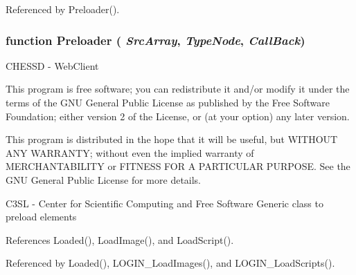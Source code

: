 Referenced by Preloader().
\subsubsection{\setlength{\rightskip}{0pt plus 5cm}function Preloader ( {\em SrcArray}, \/   {\em TypeNode}, \/   {\em CallBack})}\label{preloader_8js_ba519bf0a49938505a3eedbb05164471}


CHESSD - WebClient

This program is free software; you can redistribute it and/or modify it under the terms of the GNU General Public License as published by the Free Software Foundation; either version 2 of the License, or (at your option) any later version.

This program is distributed in the hope that it will be useful, but WITHOUT ANY WARRANTY; without even the implied warranty of MERCHANTABILITY or FITNESS FOR A PARTICULAR PURPOSE. See the GNU General Public License for more details.

C3SL - Center for Scientific Computing and Free Software Generic class to preload elements 

References Loaded(), LoadImage(), and LoadScript().

Referenced by Loaded(), LOGIN\_\-LoadImages(), and LOGIN\_\-LoadScripts().
